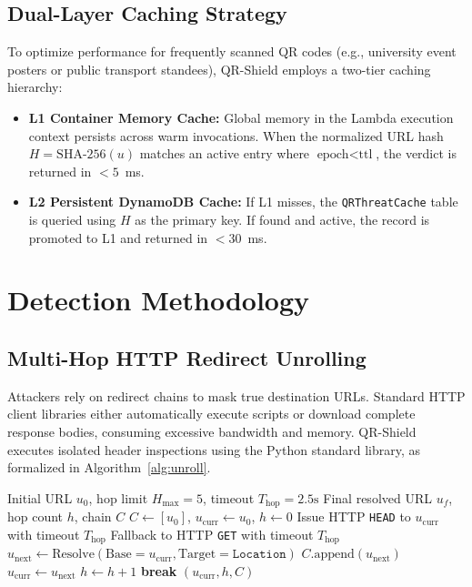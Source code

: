 \documentclass[10pt,conference,letterpaper]{IEEEtran}
\begin{document}
\subsection{Dual-Layer Caching Strategy}
To optimize performance for frequently scanned QR codes (e.g., university event posters or public transport standees), QR-Shield employs a two-tier caching hierarchy:
\begin{itemize}
    \item \textbf{L1 Container Memory Cache:} Global memory in the Lambda execution context persists across warm invocations. When the normalized URL hash $H = \text{SHA-256}(u)$ matches an active entry where $\text{epoch} < \text{ttl}$, the verdict is returned in $< 5$~ms.
    \item \textbf{L2 Persistent DynamoDB Cache:} If L1 misses, the \texttt{QRThreatCache} table is queried using $H$ as the primary key. If found and active, the record is promoted to L1 and returned in $< 30$~ms.
\end{itemize}

\section{Detection Methodology}

\subsection{Multi-Hop HTTP Redirect Unrolling}
Attackers rely on redirect chains to mask true destination URLs. Standard HTTP client libraries either automatically execute scripts or download complete response bodies, consuming excessive bandwidth and memory. QR-Shield executes isolated header inspections using the Python standard library, as formalized in Algorithm~\ref{alg:unroll}.

\begin{algorithm}[t]
\caption{Multi-Hop Redirect Tracer}
\label{alg:unroll}
\begin{algorithmic}[1]
\REQUIRE Initial URL $u_0$, hop limit $H_{\max}=5$, timeout $T_{\text{hop}}=2.5\text{s}$
\ENSURE Final resolved URL $u_f$, hop count $h$, chain $C$
\STATE $C \gets [u_0]$, $u_{\text{curr}} \gets u_0$, $h \gets 0$
    \STATE Issue HTTP \texttt{HEAD} to $u_{\text{curr}}$ with timeout $T_{\text{hop}}$
        \STATE Fallback to HTTP \texttt{GET} with timeout $T_{\text{hop}}$
    \ENDIF
        \STATE $u_{\text{next}} \gets \text{Resolve}(\text{Base}=u_{\text{curr}}, \text{Target}=\texttt{Location})$
        \STATE $C.\text{append}(u_{\text{next}})$
        \STATE $u_{\text{curr}} \gets u_{\text{next}}$
        \STATE $h \gets h + 1$
    \ELSE
        \STATE \textbf{break}
    \ENDIF
\ENDWHILE
\RETURN $(u_{\text{curr}}, h, C)$
\end{algorithmic}
\end{algorithm}
\end{document}
